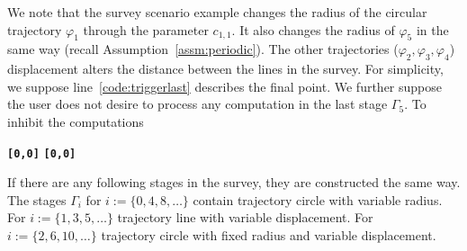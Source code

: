 \documentclass[letterpaper,10pt,conference]{ieeeconf}
\theoremstyle{definition}
\begin{document}
We note that the survey scenario example changes the radius of the circular trajectory $\varphi_1$ through the parameter $c_{1,1}$. It also changes the radius of $\varphi_5$ in the same way (recall Assumption~\ref{assm:periodic}). The other trajectories ($\varphi_2,\varphi_3,\varphi_4$) displacement alters the distance between the lines in the survey. For simplicity, we suppose line~\ref{code:triggerlast} describes the final point. We further suppose the user does not desire to process any computation in the last stage $\Gamma_5$. To inhibit the computations
\begin{algorithmic}[1]
  \STATE\textbf{\texttt{[0,0]}}
  \STATE\textbf{\texttt{[0,0]}}
\end{algorithmic}

If there are any following stages in the survey, they are constructed the same way. The stages $\Gamma_i$ for $i:=\{0,4,8,\dots\}$ contain trajectory circle with variable radius. For $i:=\{1,3,5,\dots\}$ trajectory line with variable displacement. For $i:=\{2,6,10,\dots\}$ trajectory circle with fixed radius and variable displacement.





\end{document}
